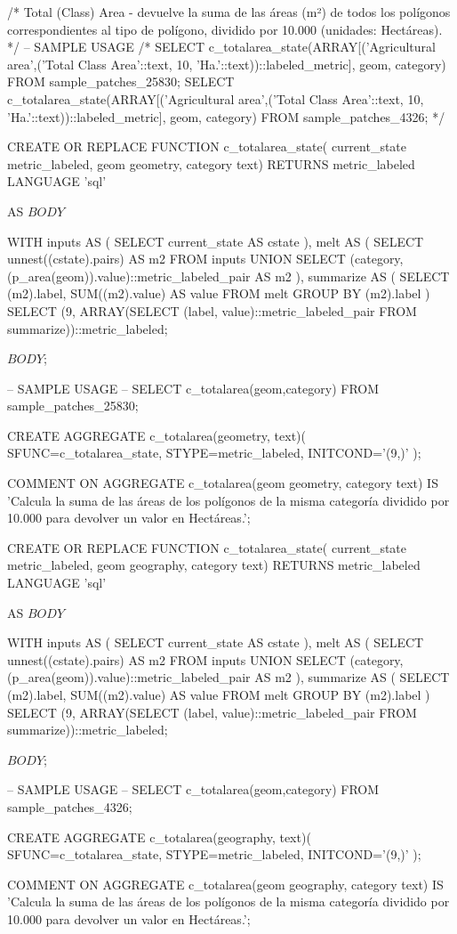 \lstset{caption=Crear una función para calcular el IDW (I),label= IDW1}
\begin{SQL}
/*
Total (Class) Area - devuelve la suma de las áreas (m²) de todos los polígonos correspondientes al tipo de polígono, dividido por 10.000 (unidades: Hectáreas).
*/
-- SAMPLE USAGE
/*
SELECT c_totalarea_state(ARRAY[('Agricultural area',('Total Class Area'::text, 10, 'Ha.'::text))::labeled_metric], geom, category) FROM sample_patches_25830;
SELECT c_totalarea_state(ARRAY[('Agricultural area',('Total Class Area'::text, 10, 'Ha.'::text))::labeled_metric], geom, category) FROM sample_patches_4326;
*/

CREATE OR REPLACE FUNCTION c_totalarea_state(
	current_state metric_labeled,
	geom geometry,
	category text)
    RETURNS metric_labeled
    LANGUAGE 'sql'

AS 
$BODY$

WITH inputs AS (
    	SELECT current_state AS cstate
), melt AS (
    	SELECT unnest((cstate).pairs) AS m2 FROM inputs
    	UNION 
	SELECT (category, (p_area(geom)).value)::metric_labeled_pair AS m2
), summarize AS (
	SELECT (m2).label, SUM((m2).value) AS value FROM melt GROUP BY (m2).label
)
SELECT (9, ARRAY(SELECT (label, value)::metric_labeled_pair FROM summarize))::metric_labeled;

$BODY$;


-- SAMPLE USAGE
-- SELECT c_totalarea(geom,category) FROM sample_patches_25830;

CREATE AGGREGATE c_totalarea(geometry, text)(
    SFUNC=c_totalarea_state,
    STYPE=metric_labeled,
    INITCOND='(9,{})'
);

COMMENT ON AGGREGATE c_totalarea(geom geometry, category text) IS 'Calcula la suma de las áreas de los polígonos de la misma categoría dividido por 10.000 para devolver un valor en Hectáreas.';



CREATE OR REPLACE FUNCTION c_totalarea_state(
	current_state metric_labeled,
	geom geography,
	category text)
    RETURNS metric_labeled
    LANGUAGE 'sql'

AS 
$BODY$

WITH inputs AS (
    	SELECT current_state AS cstate
), melt AS (
    	SELECT unnest((cstate).pairs) AS m2 FROM inputs
    	UNION 
	SELECT (category, (p_area(geom)).value)::metric_labeled_pair AS m2
), summarize AS (
	SELECT (m2).label, SUM((m2).value) AS value FROM melt GROUP BY (m2).label
)
SELECT (9, ARRAY(SELECT (label, value)::metric_labeled_pair FROM summarize))::metric_labeled;

$BODY$;


-- SAMPLE USAGE
-- SELECT c_totalarea(geom,category) FROM sample_patches_4326;

CREATE AGGREGATE c_totalarea(geography, text)(
    SFUNC=c_totalarea_state,
    STYPE=metric_labeled,
    INITCOND='(9,{})'
);

COMMENT ON AGGREGATE c_totalarea(geom geography, category text) IS 'Calcula la suma de las áreas de los polígonos de la misma categoría dividido por 10.000 para devolver un valor en Hectáreas.';
\end{SQL}

